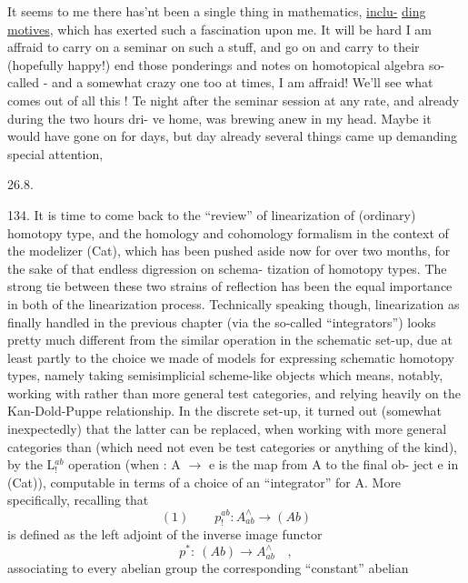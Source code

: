 
It seems to me there has'nt been a single thing in mathematics,  \uline{inclu-}%
\uline{ding motives},  which has exerted such a fascination upon me.  It will be 
hard I am affraid to carry on a seminar on such a stuff,  and go on and
carry to their (hopefully happy!) end those ponderings and notes on
homotopical algebra so-called  -  and a somewhat crazy one too at times,
I am affraid!  We'll see what comes out of all this !  Te night after
the seminar session at any rate,  and already during the two hours dri-%
ve home,     was brewing anew in my head.  Maybe it
would have gone on for days,  but   day already several things came \margin{\unsure{$\sim$}}
up demanding special attention,

26.8.

134.  It is time to come back to the ``review'' of linearization of
(ordinary) homotopy type,  and the homology and cohomology formalism
in the context of the modelizer (Cat),  which has been pushed aside now
for over two months,  for the sake of that endless digression on schema-%
tization of homotopy types.\hand{\unsure{*}}  The strong tie between these two strains
of reflection has been the equal importance in both of the linearization
process.  Technically speaking though,  linearization\hand{,} as finally handled
in the previous chapter (via the so-called ``integrators'')\hand{,} looks pretty
much different from the similar operation in the schematic set-up,  due
\hand{(}at least partly\hand{)} to the choice we made of models for expressing schematic
homotopy types,  namely taking semisimplicial scheme-like objects\over{,}{;}
which means,  notably,  working with \hand{$\Delta$} rather than more general test
categories,  and relying heavily on the Kan-Dold-Puppe relationship.
In the discrete set-up,  it turned out (somewhat inexpectedly) that the
latter can be replaced,  when working with more general categories  than
\hand{$\Delta$} (which need not even be test categories or anything of the kind),  by
the L$^{ab}_{!}$ operation (when  : A $\longrightarrow$ e is the map from A to the final ob- 
ject e in (Cat)),  computable  in terms of a choice of an ``integrator''
for A.  More specifically,  recalling that
\[ (1) \qquad p^{ab}_{!} : A^{\wedge}_{ab} \longrightarrow (Ab) \]
is defined as the left adjoint of the  inverse image functor
\[ p^{*}: \ (Ab) \longrightarrow A^{\wedge}_{ab} \quad , \]
associating to every abelian group the corresponding ``constant'' abelian
